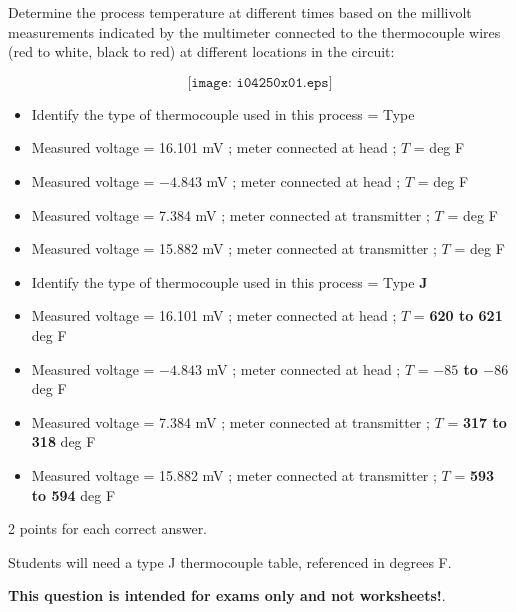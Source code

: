 

Determine the process temperature at different times based on the millivolt measurements indicated by the multimeter connected to the thermocouple wires (red to white, black to red) at different locations in the circuit:

$$\texttt{[image: i04250x01.eps]}$$

\begin{itemize}
\item{} Identify the type of thermocouple used in this process = Type \underbar{\hskip 50pt}
\vskip 5pt
\item{} Measured voltage = 16.101 mV ; meter connected at head ; $T$ = \underbar{\hskip 50pt} deg F
\vskip 5pt
\item{} Measured voltage = $-4.843$ mV ; meter connected at head ; $T$ = \underbar{\hskip 50pt} deg F
\vskip 5pt
\item{} Measured voltage = 7.384 mV ; meter connected at transmitter ; $T$ = \underbar{\hskip 50pt} deg F
\vskip 5pt
\item{} Measured voltage = 15.882 mV ; meter connected at transmitter ; $T$ = \underbar{\hskip 50pt} deg F
\end{itemize}







\begin{itemize}
\item{} Identify the type of thermocouple used in this process = Type {\bf J}
\item{} Measured voltage = 16.101 mV ; meter connected at head ; $T$ = {\bf 620 to 621} deg F
\item{} Measured voltage = $-4.843$ mV ; meter connected at head ; $T$ = {\bf $-85$ to $-86$} deg F
\item{} Measured voltage = 7.384 mV ; meter connected at transmitter ; $T$ = {\bf 317 to 318} deg F
\item{} Measured voltage = 15.882 mV ; meter connected at transmitter ; $T$ = {\bf 593 to 594} deg F
\end{itemize}

2 points for each correct answer.







Students will need a type J thermocouple table, referenced in degrees F.

\vskip 10pt

{\bf This question is intended for exams only and not worksheets!}.




